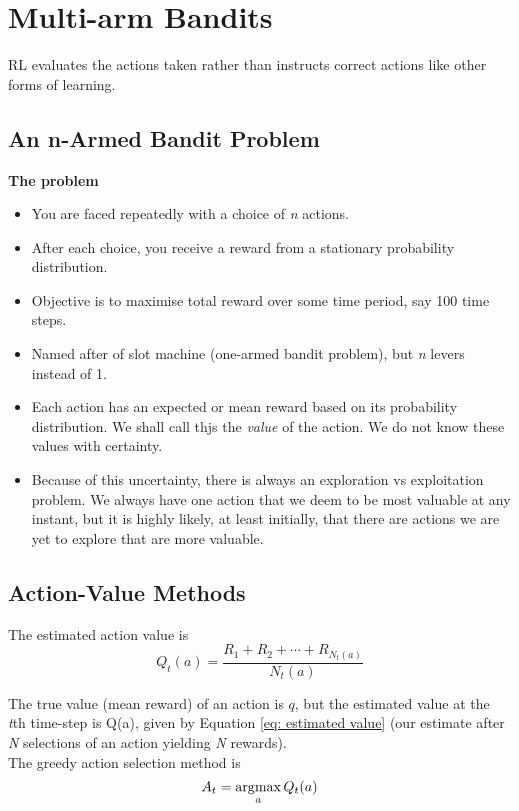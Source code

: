 \section{Multi-arm Bandits}

RL evaluates the actions taken rather than instructs correct actions like other forms of learning.

\subsection{An n-Armed Bandit Problem}
\textbf{The problem}
\begin{itemize}
\item You are faced repeatedly with a choice of \textit{n} actions.
\item After each choice, you receive a reward from a stationary probability distribution.
\item Objective is to maximise total reward over some time period, say 100 time steps.
\item Named after of slot machine (one-armed bandit problem), but \textit{n} levers instead of 1.
\item Each action has an expected or mean reward based on its probability distribution. We shall call thjs the \textit{value} of the action. We do not know these values with certainty.
\item Because of this uncertainty, there is always an exploration vs exploitation problem. We always have one action that we deem to be most valuable at any instant, but it is highly likely, at least initially, that there are actions we are yet to explore that are more valuable.
\end{itemize}

\subsection{Action-Value Methods}
The estimated action value is
\begin{equation} \label{eq: estimated value}
	Q_t(a) = \frac{R_1+R_2+\cdots+R_{N_t(a)}}{N_t(a)}
\end{equation}

The true value (mean reward) of an action is \(q\), but the estimated value at the \textit{t}th time-step is Q(a), given by Equation \ref{eq: estimated value} (our estimate after \textit{N} selections of an action yielding \textit{N} rewards).\\

The greedy action selection method is
\begin{equation} \label{eq: argmax}
A_t =\operatorname*{\arg\!\max}_a Q_t(a)
\end{equation}

